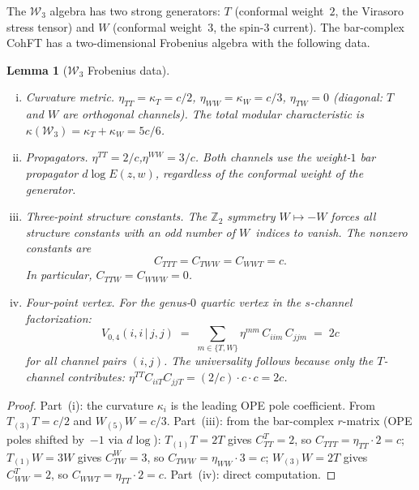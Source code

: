 \documentclass[11pt]{article}
\theoremstyle{plain}
\newtheorem{lemma}[theorem]{Lemma}
\theoremstyle{definition}
\theoremstyle{remark}
\newcommand{\cW}{\mathcal{W}}
\begin{document}
The $\cW_3$ algebra has two strong generators:
$T$ (conformal weight~$2$, the Virasoro stress tensor) and
$W$ (conformal weight~$3$, the spin-$3$ current).
The bar-complex CohFT has a two-dimensional Frobenius algebra
with the following data.

\begin{lemma}[$\cW_3$ Frobenius data]
\label{lem:w3-frobenius}
\leavevmode
\begin{enumerate}[(i)]
\item \emph{Curvature metric.}\enspace
 $\eta_{TT} = \kappa_T = c/2$,
 $\eta_{WW} = \kappa_W = c/3$,
 $\eta_{TW} = 0$ \textup{(}diagonal: $T$ and $W$ are
 orthogonal channels\textup{)}.
 The total modular characteristic is
 $\kappa(\cW_3) = \kappa_T + \kappa_W = 5c/6$.

\item \emph{Propagators.}\enspace
 $\eta^{TT} = 2/c$,\enspace $\eta^{WW} = 3/c$.
 Both channels use the weight-$1$ bar propagator
 $d\!\log E(z,w)$, regardless of the conformal weight
 of the generator.

\item \emph{Three-point structure constants.}\enspace
 The $\mathbb{Z}_2$ symmetry $W \mapsto -W$ forces all
 structure constants with an odd number of $W$~indices
 to vanish. The nonzero constants are
 \[
 C_{TTT} = C_{TWW} = C_{WWT} = c.
 \]
 In particular, $C_{TTW} = C_{WWW} = 0$.

\item \emph{Four-point vertex.}\enspace
 For the genus-$0$ quartic vertex in the $s$-channel
 factorization:
 \[
 V_{0,4}(i,i\,|\,j,j)
 \;=\;
 \sum_{m \in \{T,W\}} \eta^{mm}\,C_{iim}\,C_{jjm}
 \;=\; 2c
 \]
 for all channel pairs $(i,j)$. The universality follows
 because only the $T$-channel contributes:
 $\eta^{TT} C_{iiT} C_{jjT} = (2/c) \cdot c \cdot c = 2c$.
\end{enumerate}
\end{lemma}

\begin{proof}
Part~(i): the curvature $\kappa_i$ is the leading OPE pole
coefficient. From $T_{(3)}T = c/2$ and $W_{(5)}W = c/3$.
Part~(iii): from the bar-complex $r$-matrix (OPE poles
shifted by~$-1$ via $d\!\log$):
$T_{(1)}T = 2T$ gives $C^T_{TT} = 2$, so
$C_{TTT} = \eta_{TT} \cdot 2 = c$;
$T_{(1)}W = 3W$ gives $C^W_{TW} = 3$, so
$C_{TWW} = \eta_{WW} \cdot 3 = c$;
$W_{(3)}W = 2T$ gives $C^T_{WW} = 2$, so
$C_{WWT} = \eta_{TT} \cdot 2 = c$.
Part~(iv): direct computation.
\end{proof}
\end{document}
